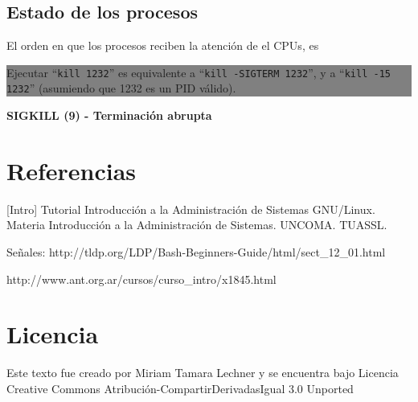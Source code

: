\documentclass[12pt]{article}
\begin{document}
\subsection*{Estado de los procesos}

El orden en que los procesos reciben la atención de el CPUs, es 

\colorbox{grey}{\parbox[t]{0.95\linewidth}{ \vspace*{0.5cm} { 
{\bf }
Ejecutar ``\texttt{kill 1232}'' es equivalente a ``\texttt{kill -SIGTERM 
1232}'', y a ``\texttt{kill -15 1232}'' (asumiendo que 1232 es un PID 
válido). 
} \vspace*{0.5cm} } } 

\textbf{SIGKILL (9) - Terminación abrupta}






\section*{Referencias}

[Intro] Tutorial Introducción a la Administración de Sistemas GNU/Linux. Materia Introducción
a la Administración de Sistemas. UNCOMA. TUASSL. 

Señales: http://tldp.org/LDP/Bash-Beginners-Guide/html/sect\_12\_01.html

http://www.ant.org.ar/cursos/curso\_intro/x1845.html

\section*{Licencia}

Este texto fue creado por Miriam Tamara Lechner y se encuentra bajo 
Licencia Creative Commons Atribución-CompartirDerivadasIgual 3.0 Unported
\end{document}
